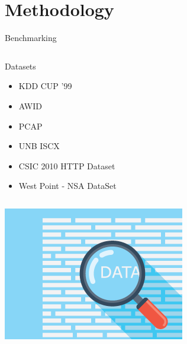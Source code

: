 \documentclass[11pt,t]{beamer}
\begin{document}
\section{Methodology}
\begin{frame}{Benchmarking}
\begin{column}{.5\textwidth}
Datasets
\begin{itemize}
    \item KDD CUP '99
    \item AWID
    \item PCAP
    \item UNB ISCX
    \item CSIC 2010 HTTP Dataset
    \item West Point - NSA DataSet
\end{itemize}
	\end{column}
\begin{column}{.5\textwidth}
		\centering
		\includegraphics[width=.8\textwidth]{datasets}
	\end{column}
\end{frame}
\end{document}
